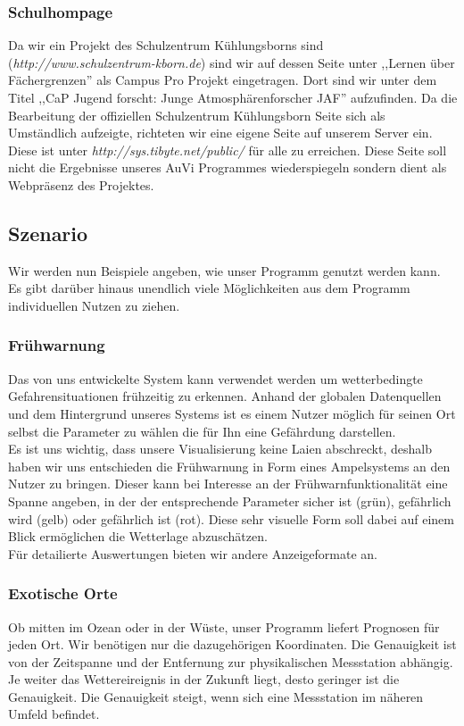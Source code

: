 \documentclass[a4paper,oneside,10pt,titlepage]{article}
\newcommand{\jf}{Jugend forscht}
\begin{document}
\subsubsection{Schulhompage}
Da wir ein Projekt des Schulzentrum Kühlungsborns sind (\textit{http://www.schulzentrum-kborn.de}) sind wir auf dessen Seite unter ,,Lernen über Fächergrenzen'' als Campus Pro Projekt eingetragen. Dort sind wir unter dem Titel ,,CaP \jf : Junge Atmosphärenforscher JAF'' aufzufinden. Da die Bearbeitung der offiziellen Schulzentrum Kühlungsborn Seite sich als Umständlich aufzeigte, richteten wir eine eigene Seite auf unserem Server ein. Diese ist unter \textit{http://sys.tibyte.net/public/} 
für alle zu erreichen. Diese Seite soll nicht die Ergebnisse unseres AuVi Programmes wiederspiegeln sondern dient als Webpräsenz des Projektes.
\subsection{Szenario}
Wir werden nun Beispiele angeben, wie unser Programm genutzt werden kann. Es gibt darüber hinaus unendlich viele Möglichkeiten aus dem Programm individuellen Nutzen zu ziehen.
\subsubsection{Frühwarnung}
Das von uns entwickelte System kann verwendet werden um wetterbedingte Gefahrensituationen frühzeitig zu erkennen. Anhand der globalen Datenquellen und dem Hintergrund unseres Systems ist es einem Nutzer möglich für seinen Ort selbst die Parameter zu wählen die für Ihn eine Gefährdung darstellen.\\
Es ist uns wichtig, dass unsere Visualisierung keine Laien abschreckt, deshalb haben wir uns entschieden die Frühwarnung in Form eines Ampelsystems an den Nutzer zu bringen. Dieser kann bei Interesse an der Frühwarnfunktionalität eine Spanne angeben, in der der entsprechende Parameter sicher ist (grün), gefährlich wird (gelb) oder gefährlich ist (rot). Diese sehr visuelle Form soll dabei auf einem Blick ermöglichen die Wetterlage abzuschätzen.\\
Für detailierte Auswertungen bieten wir andere Anzeigeformate an.
\subsubsection{Exotische Orte}
Ob mitten im Ozean oder in der Wüste, unser Programm liefert Prognosen für jeden Ort. Wir benötigen nur die dazugehörigen Koordinaten. Die Genauigkeit ist von der Zeitspanne und der Entfernung zur physikalischen Messstation abhängig. Je weiter das Wettereireignis in der Zukunft liegt, desto geringer ist die Genauigkeit. Die Genauigkeit steigt, wenn sich eine Messstation im näheren Umfeld befindet.
\end{document}
